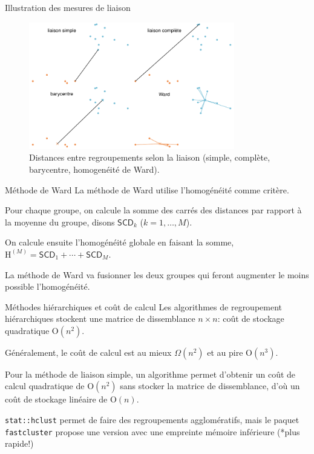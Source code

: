 \documentclass[
  ignorenonframetext,
]{beamer}
\begin{document}
\begin{frame}{Illustration des mesures de liaison}
\protect\hypertarget{illustration-des-mesures-de-liaison}{}
\begin{figure}

{\centering \includegraphics[width=0.8\textwidth,height=\textheight]{MATH60602-diapos12_files/figure-beamer/fig-distances-1.pdf}

}

\caption{\label{fig-distances}Distances entre regroupements selon la
liaison (simple, complète, barycentre, homogenéité de Ward).}

\end{figure}
\end{frame}

\begin{frame}{Méthode de Ward}
\protect\hypertarget{muxe9thode-de-ward}{}
La méthode de Ward utilise l'homogénéité comme critère.

Pour chaque groupe, on calcule la somme des carrés des distances par
rapport à la moyenne du groupe, disons \(\mathsf{SCD}_k\)
(\(k=1, \ldots, M\)).

On calcule ensuite l'homogénéité globale en faisant la somme,
\(\mathrm{H}^{(M)} = \mathsf{SCD}_1 + \cdots + \mathsf{SCD}_M\).

La méthode de Ward va fusionner les deux groupes qui feront augmenter le
moins possible l'homogénéité.
\end{frame}

\begin{frame}[fragile]{Méthodes hiérarchiques et coût de calcul}
\protect\hypertarget{muxe9thodes-hiuxe9rarchiques-et-couxfbt-de-calcul}{}
Les algorithmes de regroupement hiérarchiques stockent une matrice de
dissemblance \(n \times n\): coût de stockage quadratique
\(\mathrm{O}(n^2)\).

Généralement, le coût de calcul est au mieux \(\Omega(n^2)\) et au pire
\(\mathrm{O}(n^3)\).

Pour la méthode de liaison simple, un algorithme permet d'obtenir un
coût de calcul quadratique de \(\mathrm{O}(n^2)\) sans stocker la
matrice de dissemblance, d'où un coût de stockage linéaire de
\(\mathrm{O}(n)\).

\texttt{stat::hclust} permet de faire des regroupements agglomératifs,
mais le paquet \texttt{fastcluster} propose une version avec une
empreinte mémoire inférieure (*plus rapide!)
\end{frame}
\end{document}
